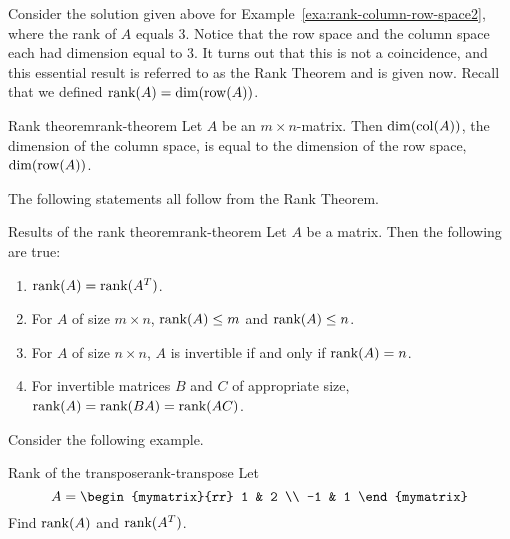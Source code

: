 Consider the solution given above for
Example~\ref{exa:rank-column-row-space2}, where the rank of $A$ equals
$3$. Notice that the row space and the column space each had dimension
equal to $3$. It turns out that this is not a coincidence, and this
essential result is referred to as the Rank Theorem and is given
now. Recall that we defined $\func{rank}(A) = \dim(\row(A))$.

\begin{theorem}{Rank theorem}{rank-theorem}
  Let $A$ be an $m \times n$-matrix. Then $\dim(\col (A))$, the
  dimension of the column space, is equal to the dimension of the row
  space, $\dim(\row(A))$.
\end{theorem}

The following statements all follow from the Rank Theorem.

\begin{corollary}{Results of the rank theorem}{rank-theorem}
  Let $A$ be a matrix. Then the following are true:
  \begin{enumerate}
  \item $\mbox{\rm rank}(A) = \mbox{\rm rank}(A^T)$.
  \item For $A$ of size $m \times n$, $\mbox{\rm rank}(A) \leq m$ and
    $\mbox{\rm rank}(A) \leq n$.
  \item For $A$ of size $n \times n$, $A$ is invertible if and only if
    $\mbox{\rm rank}(A) = n$.
  \item For invertible matrices $B$ and $C$ of appropriate size,
    $\mbox{\rm rank}(A) = \mbox{\rm rank}(BA) = \mbox{\rm rank}(AC)$.
  \end{enumerate}
\end{corollary}

Consider the following example.

\begin{example}{Rank of the transpose}{rank-transpose}
  Let \begin{equation*}
    A =
    \begin{mymatrix}{rr}
      1 & 2 \\
      -1 & 1
    \end{mymatrix}
  \end{equation*}
  Find $\mbox{\rm rank}(A)$ and $\mbox{\rm rank}(A^T)$.
\end{example}

